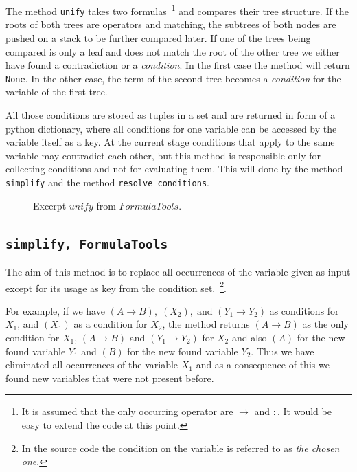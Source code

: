 The method \texttt{unify} takes two formulas~\footnote{It is assumed that the only occurring operator are $\rightarrow$ and $:$. It would be easy to extend the code at this point.} and compares their tree structure. If the roots of both trees are operators and matching, the subtrees of both nodes are pushed on a stack to be further compared later. If one of the trees being compared is only a leaf and does not match the root of the other tree we either have found a contradiction or a \emph{condition}. In the first case the method will return \texttt{None}. In the other case, the term of the second tree becomes a \emph{condition} for the variable of the first tree.

All those conditions are stored as tuples in a set and are returned in form of a python dictionary, where all conditions for one variable can be accessed by the variable itself as a key. At the current stage conditions that apply to the same variable may contradict each other, but this method is responsible only for collecting conditions and not for evaluating them. This will done by the method \texttt{simplify} and the method \texttt{resolve\_conditions}.

\begin{figure}[H]
	\caption{Excerpt $unify$ from $FormulaTools$.}
	\vspace{-10pt}
	
	\vspace{-10pt}
\end{figure}


\subsection[simplify]{\texttt{simplify, FormulaTools}}

The aim of this method is to replace all occurrences of the variable given as input except for its usage as key from the condition set.~\footnote{In the source code the condition on the variable is referred to as \emph{the chosen one}.}. 

For example, if we have $ (A \rightarrow B),\; (X_2),\; \text{and } (Y_1 \rightarrow Y_2)$ as conditions for $X_1$, and $(X_1)$ as a condition for $X_2$, the method returns $(A \rightarrow B)$ as the only condition for $X_1$, $(A \rightarrow B) \text{ and } (Y_1 \rightarrow Y_2)$ for $X_2$ and also $(A)$ for the new found variable $Y_1$ and $(B)$ for the new found variable $Y_2$. Thus we have eliminated all occurrences of the variable $X_1$ and as a consequence of this we found new variables that were not present before.

